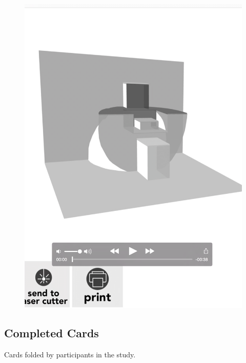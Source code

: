 \begin{figure}[htbp]
\centering
\includegraphics{figures/92_Appendix_Visual_Aids_Materials/video_card5.png}
\caption{}
\end{figure}

\clearpage

\subsection{Completed Cards}\label{completed-cards}

Cards folded by participants in the study.

